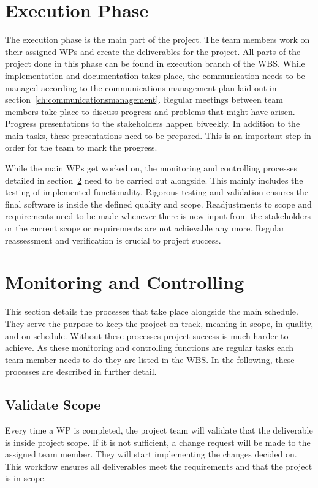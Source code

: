 \section{Execution Phase}
\label{ch:executionphase}
The execution phase is the main part of the project. The team members work on their assigned \ac{WP}s and create the deliverables for the project. All parts of the project done in this phase can be found in execution branch of the \ac{WBS}. While implementation and documentation takes place, the communication needs to be managed according to the communications management plan laid out in section~\ref{ch:communicationsmanagement}. Regular meetings between team members take place to discuss progress and problems that might have arisen. Progress presentations to the stakeholders happen biweekly. In addition to the main tasks, these presentations need to be prepared. This is an important step in order for the team to mark the progress.

While the main \ac{WP}s get worked on, the monitoring and controlling processes detailed in section~\ref{ch:monitoringcontrolling} need to be carried out alongside. This mainly includes the testing of implemented functionality. Rigorous testing and validation ensures the final software is inside the defined quality and scope. Readjustments to scope and requirements need to be made whenever there is new input from the stakeholders or the current scope or requirements are not achievable any more. Regular reassessment and verification is crucial to project success.


\section{Monitoring and Controlling}
\label{ch:monitoringcontrolling}
This section details the processes that take place alongside the main schedule. They serve the purpose to keep the project on track, meaning in scope, in quality, and on schedule. Without these processes project success is much harder to achieve. As these monitoring and controlling functions are regular tasks each team member needs to do they are listed in the \ac{WBS}. In the following, these processes are described in further detail.

\subsection{Validate Scope}
\label{ch:validatescope}
Every time a \ac{WP} is completed, the project team will validate that the deliverable is inside project scope. If it is not sufficient, a change request will be made to the assigned team member. They will start implementing the changes decided on. This workflow ensures all deliverables meet the requirements and that the project is in scope.

